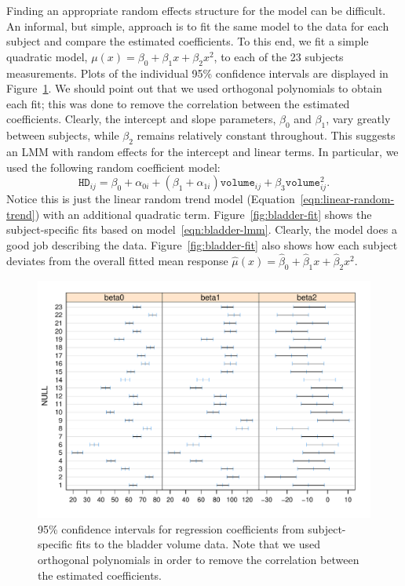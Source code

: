 \documentclass[cmfont,usenames,dvipsnames,leqno]{afit-etd}\usepackage[]{graphicx}\usepackage[]{color}
\makeatletter
\def\maxwidth{ %
  \ifdim\Gin@nat@width>\linewidth
    \linewidth
  \else
    \Gin@nat@width
  \fi
}
\newenvironment{knitrout}{}{} %
\renewenvironment{knitrout}{\begin{singlespace}}{\end{singlespace}}
\newcommand{\wh}[1]{\ensuremath{\widehat{#1}}}
\makeatother
\begin{document}
Finding an appropriate random effects structure for the model can be difficult. An informal, but simple, approach is to fit the same model to the data for each subject and compare the estimated coefficients. To this end, we fit a simple quadratic model, $\mu(x) = \beta_0 + \beta_1 x + \beta_2 x^2$, to each of the 23 subjects measurements. Plots of the individual 95\% confidence intervals are displayed in Figure~\ref{fig:bladder-intervals}. We should point out that we used orthogonal polynomials to obtain each fit; this was done to remove the correlation between the estimated coefficients. Clearly, the intercept and slope parameters, $\beta_0$ and $\beta_1$, vary greatly between subjects, while $\beta_2$ remains relatively constant throughout. This suggests an \ac{LMM} with random effects for the intercept and linear terms. In particular, we used the following random coefficient model:
\begin{equation}
\label{eqn:bladder-lmm}
  \texttt{HD}_{ij} = \beta_0+\alpha_{0i} + \left(\beta_1+\alpha_{1i}\right)\texttt{volume}_{ij} + \beta_3\texttt{volume}_{ij}^2.
\end{equation}
Notice this is just the linear random trend model (Equation~\eqref{eqn:linear-random-trend}) with an additional quadratic term. Figure~\ref{fig:bladder-fit} shows the subject-specific fits based on model~\eqref{eqn:bladder-lmm}. Clearly, the model does a good job describing the data. Figure~\ref{fig:bladder-fit} also shows how each subject deviates from the overall fitted mean response $\wh{\mu}\left(x\right) = \wh{\beta}_0 + \wh{\beta}_1 x + \wh{\beta}_2 x^2$.

\begin{knitrout}
\color{fgcolor}\begin{figure}[H]

\includegraphics[width=\maxwidth]{figure/bladder-intervals} \caption[95\% confidence intervals for the bladder volume example]{95\% confidence intervals for regression coefficients from subject-specific fits to the bladder volume data. Note that we used orthogonal polynomials in order to remove the correlation between the estimated coefficients.\label{fig:bladder-intervals}}
\end{figure}


\end{knitrout}
\end{document}
